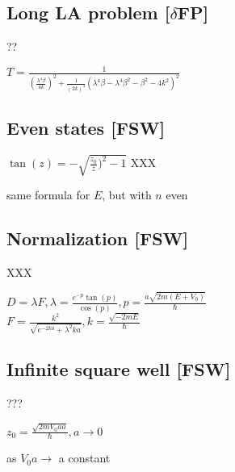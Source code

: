\documentclass{article}
\newcommand{\<}{\langle}
\renewcommand{\>}{\rangle}
\begin{document}
\subsection{Long LA problem [$\delta$FP]}

??

$T = \frac{1}{(\frac{\lambda^4\beta}{4k})^2 + \frac{1}{(2k)^4}(\lambda^4\beta - \lambda^4\beta^2 - \beta^2 - 4k^2)^2}$

\subsection{Even states [FSW]}

$\tan(z) = -\sqrt{\frac{z_0}{z})^2 - 1}$ XXX

same formula for $E$, but with $n$ even

\subsection{Normalization [FSW]}

XXX

$D = \lambda F, \lambda = \frac{e^{-p}\tan(p)}{\cos(p)}, p = \frac{a\sqrt{2m(E+V_0)}}{\hbar}$
\\
$F = \frac{k^2}{\sqrt{e^{-2ka} + \lambda^2ka}}, k = \frac{\sqrt{-2mE}}{\hbar}$

\subsection{Infinite square well [FSW]}

???

$z_0 = \frac{\sqrt{2mV_0aa}}{\hbar}, a \rightarrow 0$

as $V_0a \rightarrow$ a constant
\end{document}
